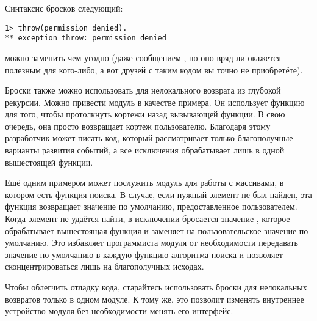 Синтаксис бросков следующий:
\begin{lstlisting}[style=erlang]
1> throw(permission_denied).
** exception throw: permission_denied
\end{lstlisting}
 можно заменить чем угодно (даже сообщением , но оно вряд ли окажется полезным для кого\--либо, а вот друзей с таким кодом вы точно не приобретёте).

Броски также можно использовать для нелокального возврата из глубокой рекурсии.
Можно привести модуль  в качестве примера.
Он использует функцию  для того, чтобы протолкнуть кортежи  назад вызывающей функции.
В свою очередь, она просто возвращает кортеж пользователю.
Благодаря этому разработчик может писать код, который рассматривает только благополучные варианты развития событий, а все исключения обрабатывает лишь в одной вышестоящей функции.

Ещё одним примером может послужить модуль для работы с массивами, в котором есть функция поиска.
В случае, если нужный элемент не был найден, эта функция возвращает значение по умолчанию, предоставленное пользователем.
Когда элемент не удаётся найти, в исключении бросается значение , которое обрабатывает вышестоящая функция и заменяет на пользовательское значение по умолчанию.
Это избавляет программиста модуля от необходимости передавать значение по умолчанию в каждую функцию алгоритма поиска и позволяет сконцентрироваться лишь на благополучных исходах.

Чтобы облегчить отладку кода, старайтесь использовать броски для нелокальных возвратов только в одном модуле.
К тому же, это позволит изменять внутреннее устройство модуля без необходимости менять его интерфейс.
